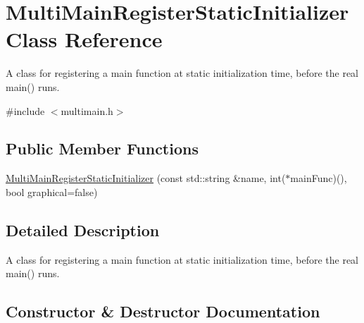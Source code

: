 \hypertarget{classstanfordcpplib_1_1MultiMainRegisterStaticInitializer}{}\section{Multi\+Main\+Register\+Static\+Initializer Class Reference}
\label{classstanfordcpplib_1_1MultiMainRegisterStaticInitializer}


A class for registering a main function at static initialization time, before the real main() runs.  




{\ttfamily \#include $<$multimain.\+h$>$}

\subsection*{Public Member Functions}
\begin{DoxyCompactItemize}
\item 
\mbox{\hyperlink{classstanfordcpplib_1_1MultiMainRegisterStaticInitializer_a7ca0251bbf9b3daf519644d089e0643d}{Multi\+Main\+Register\+Static\+Initializer}} (const std\+::string \&name, int($\ast$main\+Func)(), bool graphical=false)
\end{DoxyCompactItemize}


\subsection{Detailed Description}
A class for registering a main function at static initialization time, before the real main() runs. 

\subsection{Constructor \& Destructor Documentation}
\mbox{\label{classstanfordcpplib_1_1MultiMainRegisterStaticInitializer_a7ca0251bbf9b3daf519644d089e0643d}} 
